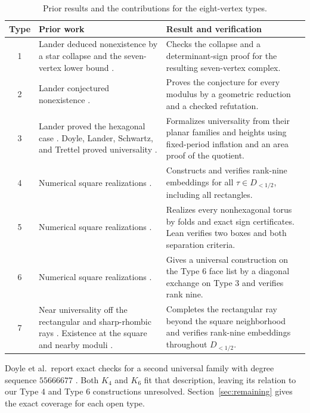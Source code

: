 \documentclass[11pt,letterpaper]{amsart}
\begin{document}
\begin{table}[htbp]
\caption{Prior results and the contributions for the eight-vertex types.}
\label{tab:contributions}
\small
\begin{tabularx}{\linewidth}{@{}cXX@{}}
\toprule
Type & Prior work & Result and verification\\
\midrule
1 & Lander deduced nonexistence by a star collapse and the
    seven-vertex lower bound \cite[\S6]{lander}. &
    Checks the collapse and a determinant-sign proof for the
    resulting seven-vertex complex.\\[1pt]
2 & Lander conjectured nonexistence \cite[\S6]{lander}. &
    Proves the conjecture for every modulus by a geometric reduction
    and a checked refutation.\\[1pt]
3 & Lander proved the hexagonal case \cite{lander}. Doyle, Lander,
    Schwartz, and Trettel proved universality \cite[Theorem~1.1]{dlst}. &
    Formalizes universality from their planar families and heights
    using fixed-period inflation and an area proof of the quotient.\\[1pt]
4 & Numerical square realizations \cite[\S6]{lander}. &
    Constructs and verifies rank-nine embeddings for all
    \(\tau\in D_{<1/2}\), including all rectangles.\\[1pt]
5 & Numerical square realizations \cite[\S6]{lander}. &
    Realizes every nonhexagonal torus by folds and exact sign
    certificates. Lean verifies two boxes and both separation criteria.\\[1pt]
6 & Numerical square realizations \cite[\S6]{lander}. &
    Gives a universal construction on the Type \(6\) face list by a
    diagonal exchange on Type \(3\) and verifies rank nine.\\[1pt]
7 & Near universality off the rectangular and sharp-rhombic rays
    \cite{ds}. Existence at the square and nearby moduli \cite{lander}. &
    Completes the rectangular ray beyond the square neighborhood and
    verifies rank-nine embeddings throughout \(D_{<1/2}\).\\
\bottomrule
\end{tabularx}
\end{table}

Doyle et al.\ report exact checks for a second universal family with
degree sequence \(55666677\) \cite[\S6]{dlst}. Both \(K_4\) and \(K_6\)
fit that description, leaving its relation to our Type \(4\) and Type \(6\)
constructions unresolved.
Section~\ref{sec:remaining} gives the exact coverage for each open type.
\end{document}
